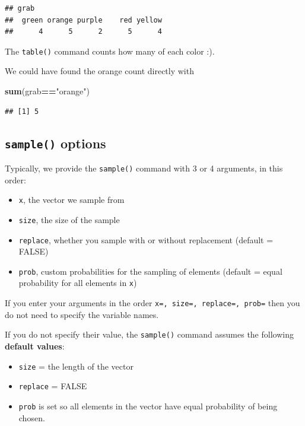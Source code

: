 \documentclass[
]{book}
\newenvironment{Shaded}{\begin{snugshade}}{\end{snugshade}}
\newcommand{\FunctionTok}[1]{\textcolor[rgb]{0.13,0.29,0.53}{\textbf{#1}}}
\newcommand{\NormalTok}[1]{#1}
\newcommand{\SpecialCharTok}[1]{\textcolor[rgb]{0.81,0.36,0.00}{\textbf{#1}}}
\newcommand{\StringTok}[1]{\textcolor[rgb]{0.31,0.60,0.02}{#1}}
\providecommand{\tightlist}{%
  \setlength{\itemsep}{0pt}\setlength{\parskip}{0pt}}
\theoremstyle{definition}
\theoremstyle{definition}
\theoremstyle{definition}
\theoremstyle{definition}
\theoremstyle{remark}
\begin{document}
\begin{verbatim}
## grab
##  green orange purple    red yellow 
##      4      5      2      5      4
\end{verbatim}

The \texttt{table()} command counts how many of each color :).

We could have found the orange count directly with

\begin{Shaded}
\begin{Highlighting}[]
\FunctionTok{sum}\NormalTok{(grab}\SpecialCharTok{==}\StringTok{"orange"}\NormalTok{)}
\end{Highlighting}
\end{Shaded}

\begin{verbatim}
## [1] 5
\end{verbatim}

\subsection*{\texorpdfstring{\texttt{sample()} options}{sample() options}}\label{sample-options}

Typically, we provide the \texttt{sample()} command with 3 or 4 arguments, in this order:

\begin{itemize}
\tightlist
\item
  \texttt{x}, the vector we sample from
\item
  \texttt{size}, the size of the sample
\item
  \texttt{replace}, whether you sample with or without replacement (default = FALSE)
\item
  \texttt{prob}, custom probabilities for the sampling of elements (default = equal probability for all elements in \texttt{x})
\end{itemize}

If you enter your arguments in the order \texttt{x=,\ size=,\ replace=,\ prob=} then you do not need to specify the variable names.

If you do not specify their value, the \texttt{sample()} command assumes the following \textbf{default values}:

\begin{itemize}
\tightlist
\item
  \texttt{size} = the length of the vector
\item
  \texttt{replace} = FALSE
\item
  \texttt{prob} is set so all elements in the vector have equal probability of being chosen.
\end{itemize}
\end{document}
